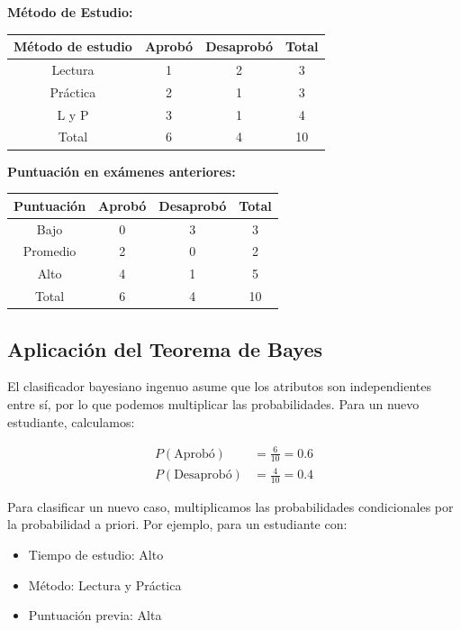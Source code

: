 \documentclass[12pt]{article}
\begin{document}
\vspace{1em}

\textbf{Método de Estudio:}
\begin{table}[H]
    \centering
    \begin{tabular}{cccc}
        \toprule
        Método de estudio & Aprobó & Desaprobó & Total \\
        \midrule
        Lectura & 1 & 2 & 3 \\
        Práctica & 2 & 1 & 3 \\
        L y P & 3 & 1 & 4 \\
        \midrule
        Total & 6 & 4 & 10 \\
        \bottomrule
    \end{tabular}
\end{table}

\vspace{1em}

\textbf{Puntuación en exámenes anteriores:}
\begin{table}[H]
    \centering
    \begin{tabular}{cccc}
        \toprule
        Puntuación & Aprobó & Desaprobó & Total \\
        \midrule
        Bajo & 0 & 3 & 3 \\
        Promedio & 2 & 0 & 2 \\
        Alto & 4 & 1 & 5 \\
        \midrule
        Total & 6 & 4 & 10 \\
        \bottomrule
    \end{tabular}
\end{table}

\subsection{Aplicación del Teorema de Bayes}
El clasificador bayesiano ingenuo asume que los atributos son independientes entre sí, por lo que podemos multiplicar las probabilidades. Para un nuevo estudiante, calculamos:

\begin{align*}
P(\text{Aprobó}) &= \frac{6}{10} = 0.6 \\
P(\text{Desaprobó}) &= \frac{4}{10} = 0.4
\end{align*}

Para clasificar un nuevo caso, multiplicamos las probabilidades condicionales por la probabilidad a priori. Por ejemplo, para un estudiante con:
\begin{itemize}
    \item Tiempo de estudio: Alto
    \item Método: Lectura y Práctica
    \item Puntuación previa: Alta
\end{itemize}
\end{document}
